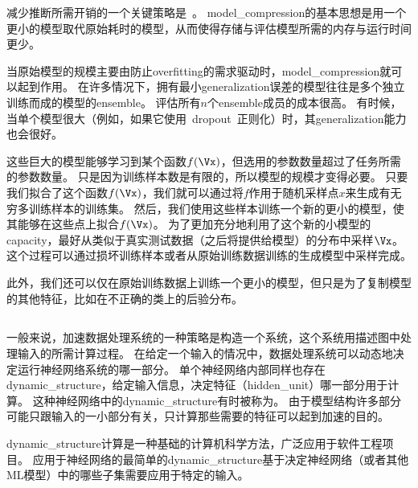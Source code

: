 减少推断所需开销的一个关键策略是~\citep{bucilua2006model}。
\gls{model_compression}的基本思想是用一个更小的模型取代原始耗时的模型，从而使得存储与评估模型所需的内存与运行时间更少。



当原始模型的规模主要由防止\gls{overfitting}的需求驱动时，\gls{model_compression}就可以起到作用。
在许多情况下，拥有最小\gls{generalization}误差的模型往往是多个独立训练而成的模型的\gls{ensemble}。
评估所有$n$个\gls{ensemble}成员的成本很高。
有时候，当单个模型很大（例如，如果它使用~\gls{dropout}~正则化）时，其\gls{generalization}能力也会很好。

这些巨大的模型能够学习到某个函数$f(\Vx)$，但选用的参数数量超过了任务所需的参数数量。
只是因为训练样本数是有限的，所以模型的规模才变得必要。
只要我们拟合了这个函数$f(\Vx)$，我们就可以通过将$f$作用于随机采样点$x$来生成有无穷多训练样本的训练集。
然后，我们使用这些样本训练一个新的更小的模型，使其能够在这些点上拟合$f(\Vx)$。
为了更加充分地利用了这个新的小模型的\gls{capacity}，最好从类似于真实测试数据（之后将提供给模型）的分布中采样$\Vx$。
这个过程可以通过损坏训练样本或者从原始训练数据训练的生成模型中采样完成。

此外，我们还可以仅在原始训练数据上训练一个更小的模型，但只是为了复制模型的其他特征，比如在不正确的类上的后验分布\citep{Hinton-dark-2014,hinton2015distilling}。

\subsection{}
\label{sec:dynamic_structure}

一般来说，加速数据处理系统的一种策略是构造一个系统，这个系统用描述图中处理输入的所需计算过程。
在给定一个输入的情况中，数据处理系统可以动态地决定运行神经网络系统的哪一部分。
单个神经网络内部同样也存在\gls{dynamic_structure}，给定输入信息，决定特征（\gls{hidden_unit}）哪一部分用于计算。
这种神经网络中的\gls{dynamic_structure}有时被称为\citep{Bengio-chapterSLSP-2013,bengio2013estimating}。
由于模型结构许多部分可能只跟输入的一小部分有关，只计算那些需要的特征可以起到加速的目的。

\gls{dynamic_structure}计算是一种基础的计算机科学方法，广泛应用于软件工程项目。
应用于神经网络的最简单的\gls{dynamic_structure}基于决定神经网络（或者其他\gls{ML}模型）中的哪些子集需要应用于特定的输入。

